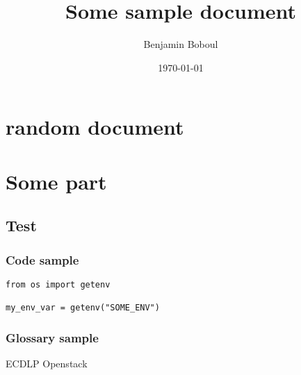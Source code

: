 \documentclass[french]{alocer}
\title{Some sample document}
\author{Benjamin Boboul}
\date{\today}
\begin{document}
	\frontmatter
	\maketitle
	\tableofcontents
	\mainmatter
	\part{random document}
	\Blinddocument 
	\part{Some part}
	\chapter*{Test}
	
	\section{Code sample}
\begin{verbatim}
from os import getenv

my_env_var = getenv("SOME_ENV")
\end{verbatim}

	\section[Glossary]{Glossary sample}
	\gls{ECDLP}
	\gls{Openstack}

	\backmatter
	\listoffigures
	\listoftables
	\printglossaries
	\appendix
\end{document}
